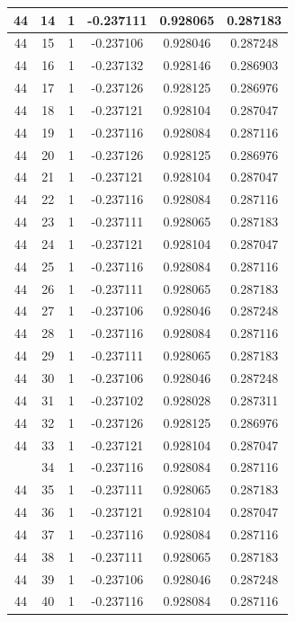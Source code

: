 \documentclass[12pt,a4paper]{article}
\numberwithin{equation}{section}
\numberwithin{figure}{section}
\numberwithin{table}{section}
\begin{document}
\begin{longtable}{|c|c|c|c|c|c|}
44 & 14 & 1 & -0.237111 & 0.928065 & 0.287183 \\ \hline
44 & 15 & 1 & -0.237106 & 0.928046 & 0.287248 \\ \hline
44 & 16 & 1 & -0.237132 & 0.928146 & 0.286903 \\ \hline
44 & 17 & 1 & -0.237126 & 0.928125 & 0.286976 \\ \hline
44 & 18 & 1 & -0.237121 & 0.928104 & 0.287047 \\ \hline
44 & 19 & 1 & -0.237116 & 0.928084 & 0.287116 \\ \hline
44 & 20 & 1 & -0.237126 & 0.928125 & 0.286976 \\ \hline
44 & 21 & 1 & -0.237121 & 0.928104 & 0.287047 \\ \hline
44 & 22 & 1 & -0.237116 & 0.928084 & 0.287116 \\ \hline
44 & 23 & 1 & -0.237111 & 0.928065 & 0.287183 \\ \hline
44 & 24 & 1 & -0.237121 & 0.928104 & 0.287047 \\ \hline
44 & 25 & 1 & -0.237116 & 0.928084 & 0.287116 \\ \hline
44 & 26 & 1 & -0.237111 & 0.928065 & 0.287183 \\ \hline
44 & 27 & 1 & -0.237106 & 0.928046 & 0.287248 \\ \hline
44 & 28 & 1 & -0.237116 & 0.928084 & 0.287116 \\ \hline
44 & 29 & 1 & -0.237111 & 0.928065 & 0.287183 \\ \hline
44 & 30 & 1 & -0.237106 & 0.928046 & 0.287248 \\ \hline
44 & 31 & 1 & -0.237102 & 0.928028 & 0.287311 \\ \hline
44 & 32 & 1 & -0.237126 & 0.928125 & 0.286976 \\ \hline
44 & 33 & 1 & -0.237121 & 0.928104 & 0.287047 \\ \hline
\pagebreak
44 & 34 & 1 & -0.237116 & 0.928084 & 0.287116 \\ \hline
44 & 35 & 1 & -0.237111 & 0.928065 & 0.287183 \\ \hline
44 & 36 & 1 & -0.237121 & 0.928104 & 0.287047 \\ \hline
44 & 37 & 1 & -0.237116 & 0.928084 & 0.287116 \\ \hline
44 & 38 & 1 & -0.237111 & 0.928065 & 0.287183 \\ \hline
44 & 39 & 1 & -0.237106 & 0.928046 & 0.287248 \\ \hline
44 & 40 & 1 & -0.237116 & 0.928084 & 0.287116 \\ \hline

\end{longtable}
\end{document}
